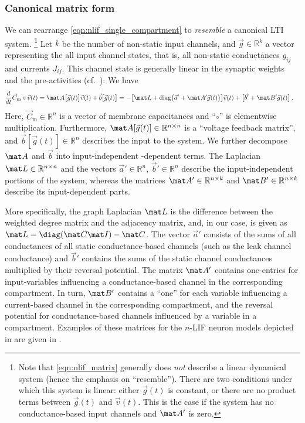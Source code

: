 \subsubsection{Canonical matrix form}
We can rearrange \cref{eqn:nlif_single_compartment} to \emph{resemble} a canonical LTI system.%
\footnote{
Note that \cref{eqn:nlif_matrix} generally does \emph{not} describe a linear dynamical system (hence the emphasis on \enquote{resemble}).
There are two conditions under which this system is linear: either $\vec g(t)$ is constant, or there are no product terms between $\vec g(t)$ and $\vec v(t)$.
This is the case if the system has no conductance-based input channels and $\mat A'$ is zero.
}
Let $k$ be the number of non-static input channels, and $\vec g \in \mathbb{R}^k$ a vector representing the all input channel states, that is, all non-static conductances $g_{ij}$ and currents $J_{ij}$.
This channel state is generally linear in the synaptic weights and the pre-activities (cf.~).
We have
\begin{align}
	\frac{d}{dt} \vec{C}_\mathrm{m} \circ \vec v(t)
	&= \mat A\big[\vec g(t)\big] \vec v(t) + \vec b\big[\vec g(t)\big]
	 = -\big[\mat L + \mathrm{diag}\big(\vec a' + \mat A' \vec g(t)\big)\big] \vec v(t) + \big[\vec b' + \mat B' \vec g(t)\big] \,.
	\label{eqn:nlif_matrix}
\end{align}
Here, $\vec{C}_\mathrm{m} \in \mathbb{R}^n$ is a vector of membrane capacitances and \enquote{$\circ$} is elementwise multiplication.
Furthermore, $\mat A[\vec g(t)] \in \mathbb{R}^{n \times n}$ is a \enquote{voltage feedback matrix}, and $\vec b[\vec g(t)] \in \mathbb{R}^n$ describes the input to the system.
We further decompose $\mat A$ and $\vec b$ into input-independent -dependent terms.
The Laplacian $\mat L \in \mathbb{R}^{n \times n}$ and the vectors $\vec a' \in \mathbb{R}^n$, $\vec b' \in \mathbb{R}^n$ describe the input-independent portions of the system, whereas the matrices $\mat A' \in \mathbb{R}^{n \times k}$ and $\mat B' \in \mathbb{R}^{n \times k}$ describe its input-dependent parts.

More specifically, the graph Laplacian $\mat L$ is the difference between the weighted degree matrix and the adjacency matrix, and, in our case, is given as $\mat L = \diag(\mat C \mat I) - \mat C$.
The vector $\vec a'$ consists of the sums of all conductances of all static conductance-based channels (such as the leak channel conductance) and $\vec b'$ contains the sums of the static channel conductances multiplied by their reversal potential.
The matrix $\mat A'$ contains one-entries for input-variables influencing a conductance-based channel in the corresponding compartment.
In turn, $\mat B'$ contains a \enquote{one} for each variable influencing a current-based channel in the corresponding compartment, and the reversal potential for conductance-based channels influenced by a variable in a compartment.
Examples of these matrices for the $n$-LIF neuron models depicted in  are given in .

